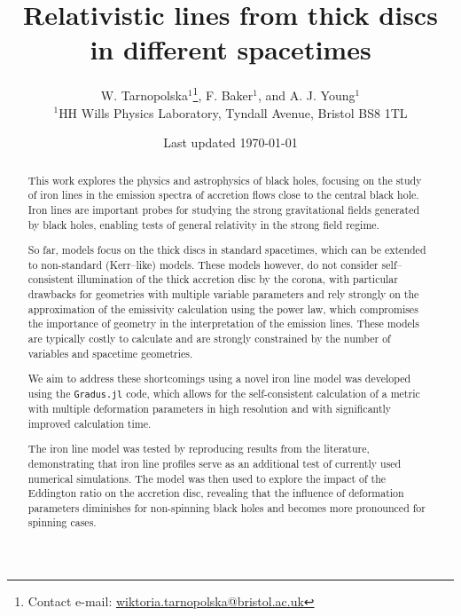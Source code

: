 \documentclass[fleqn,usenatbib,useAMS]{mnras}
\title[Relativistic disc lines]{Relativistic lines from thick discs in different spacetimes}
\author[W. Tarnopolska, et al.]{W. Tarnopolska$^{1}$\thanks{Contact e-mail: \href{mailto:wiktoria.tarnopolska@bristol.ac.uk}{wiktoria.tarnopolska@bristol.ac.uk}}, F. Baker$^{1}$, and A. J. Young$^{1}$ \\
$^{1}$HH Wills Physics Laboratory, Tyndall Avenue, Bristol BS8 1TL}
\date{Last updated \today}
\begin{document}
\label{firstpage}
\pagerange{\pageref{firstpage}--\pageref{lastpage}}
\maketitle





\begin{abstract}
This work explores the physics and astrophysics of black holes, focusing on the study of iron lines in the emission spectra of accretion flows close to the central black hole. Iron lines are important probes for studying the strong gravitational fields generated by black holes, enabling tests of general relativity in the strong field regime. 

So far, models focus on the thick discs in standard spacetimes, which can be extended to non-standard (Kerr--like) models. These models however, do not consider self--consistent illumination of the thick accretion disc by the corona, with particular drawbacks for geometries with multiple variable parameters and rely strongly on the approximation of the emissivity calculation using the power law, which compromises the importance of geometry in the interpretation of the emission lines. These models are typically costly to calculate and are strongly constrained by the number of variables and spacetime geometries. 

We aim to address these shortcomings using a novel iron line model was developed using the {\tt Gradus.jl} code, which allows for the self-consistent calculation of a metric with multiple deformation parameters in high resolution and with significantly improved calculation time.

The iron line model was tested by reproducing results from the literature, demonstrating that iron line profiles serve as an additional test of currently used numerical simulations. The model was then used to explore the impact of the Eddington ratio on the accretion disc, revealing that the influence of deformation parameters diminishes for non-spinning black holes and becomes more pronounced for spinning cases. 

\end{abstract}
\end{document}
